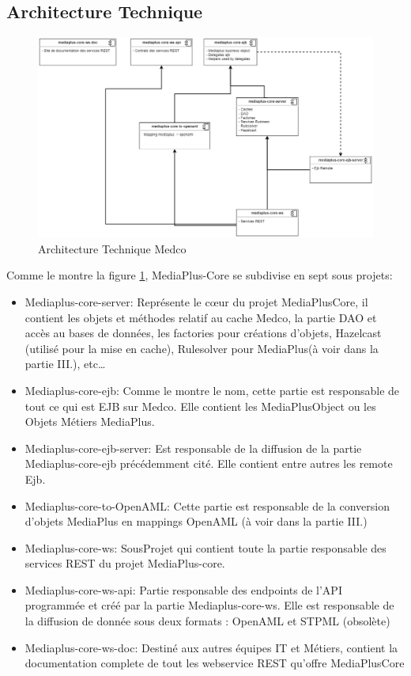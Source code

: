 \subsection{Architecture Technique}
\hfill \break
\begin{figure}[ht]
    \centering
    \includegraphics[width=\columnwidth]{img/medco-arch.png}
    \caption{Architecture Technique Medco}
    \label{fig:medcoArchTech}
\end{figure}
\pagebreak
\par Comme le montre la figure \ref{fig:medcoArchTech}, MediaPlus-Core se subdivise en sept sous projets:
\begin{itemize}
    \item Mediaplus-core-server: Représente le cœur du projet MediaPlusCore, il contient les objets et méthodes relatif au cache Medco, la partie DAO  et accès au bases de données, les factories pour créations d'objets, Hazelcast (utilisé pour la mise en cache), Rulesolver pour MediaPlus(à voir dans la partie III.), etc\dots
    \item Mediaplus-core-ejb: Comme le montre le nom, cette partie est responsable de tout ce qui est EJB sur Medco. Elle contient les MediaPlusObject ou les Objets Métiers MediaPlus.
    \item Mediaplus-core-ejb-server: Est responsable de la diffusion de la partie Mediaplus-core-ejb précédemment cité. Elle contient entre autres les remote Ejb.
    \item Mediaplus-core-to-OpenAML: Cette partie est responsable de la conversion d'objets MediaPlus en mappings OpenAML (à voir dans la partie III.)
    \item Mediaplus-core-ws: SousProjet qui contient toute la partie responsable des services REST du projet MediaPlus-core.
    \item Mediaplus-core-ws-api: Partie responsable des endpoints de l'API programmée et créé par la partie Mediaplus-core-ws. Elle est responsable de la diffusion de donnée sous deux formats : OpenAML et STPML (obsolète)
    \item Mediaplus-core-ws-doc: Destiné aux autres équipes IT et Métiers, contient la documentation complete de tout les webservice REST qu'offre MediaPlusCore
\end{itemize}

